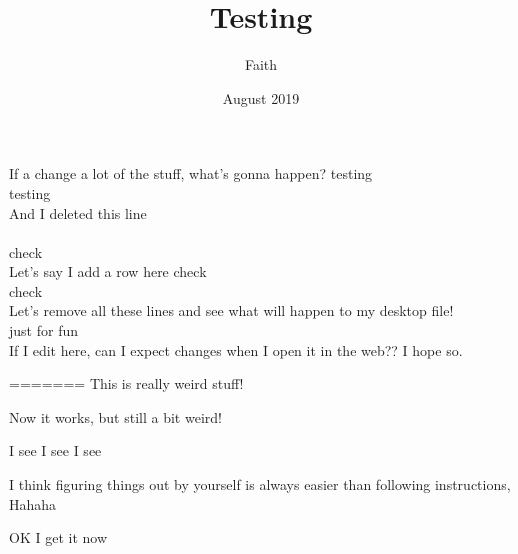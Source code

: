 \documentclass{article}
\title{Testing}
\date{August 2019}
\author{Faith}
\begin{document}
\maketitle
If a change a lot of the stuff, what's gonna happen?
testing \\
testing\\
And I deleted this line
\\
\\
check\\


Let's say I add a row here
check\\
check\\
Let's remove all these lines and see what will happen to my desktop file!
\\
just for fun
\\

If I edit here, can I expect changes when I open it in the web?? I hope so.


=======
This is really weird stuff!


Now it works, but still a bit weird!

I see I see I see 



I think figuring things out by yourself is always easier than following instructions, Hahaha


OK I get it now
\end{document}
